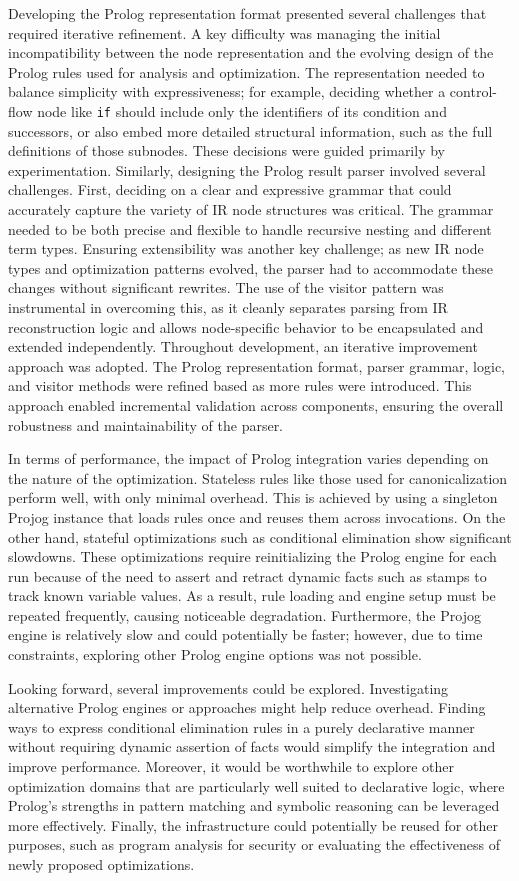 Developing the Prolog representation format presented several challenges that required iterative refinement. A key difficulty was managing the initial incompatibility between the node representation and the evolving design of the Prolog rules used for analysis and optimization. The representation needed to balance simplicity with expressiveness; for example, deciding whether a control-flow node like \texttt{if} should include only the identifiers of its condition and successors, or also embed more detailed structural information, such as the full definitions of those subnodes. These decisions were guided primarily by experimentation. Similarly, designing the Prolog result parser involved several challenges. First, deciding on a clear and expressive grammar that could accurately capture the variety of IR node structures was critical. The grammar needed to be both precise and flexible to handle recursive nesting and different term types. Ensuring extensibility was another key challenge; as new IR node types and optimization patterns evolved, the parser had to accommodate these changes without significant rewrites. The use of the visitor pattern was instrumental in overcoming this, as it cleanly separates parsing from IR reconstruction logic and allows node-specific behavior to be encapsulated and extended independently. Throughout development, an iterative improvement approach was adopted. The Prolog representation format, parser grammar, logic, and visitor methods were refined based as more rules were introduced. This approach enabled incremental validation across components, ensuring the overall robustness and maintainability of the parser.

In terms of performance, the impact of Prolog integration varies depending on the nature of the optimization. Stateless rules like those used for canonicalization perform well, with only minimal overhead. This is achieved by using a singleton Projog instance that loads rules once and reuses them across invocations. On the other hand, stateful optimizations such as conditional elimination show significant slowdowns. These optimizations require reinitializing the Prolog engine for each run because of the need to assert and retract dynamic facts such as stamps to track known variable values. As a result, rule loading and engine setup must be repeated frequently, causing noticeable degradation. Furthermore, the Projog engine is relatively slow and could potentially be faster; however, due to time constraints, exploring other Prolog engine options was not possible.

Looking forward, several improvements could be explored. Investigating alternative Prolog engines or approaches might help reduce overhead. Finding ways to express conditional elimination rules in a purely declarative manner without requiring dynamic assertion of facts would simplify the integration and improve performance. Moreover, it would be worthwhile to explore other optimization domains that are particularly well suited to declarative logic, where Prolog's strengths in pattern matching and symbolic reasoning can be leveraged more effectively. Finally, the infrastructure could potentially be reused for other purposes, such as program analysis for security or evaluating the effectiveness of newly proposed optimizations.

